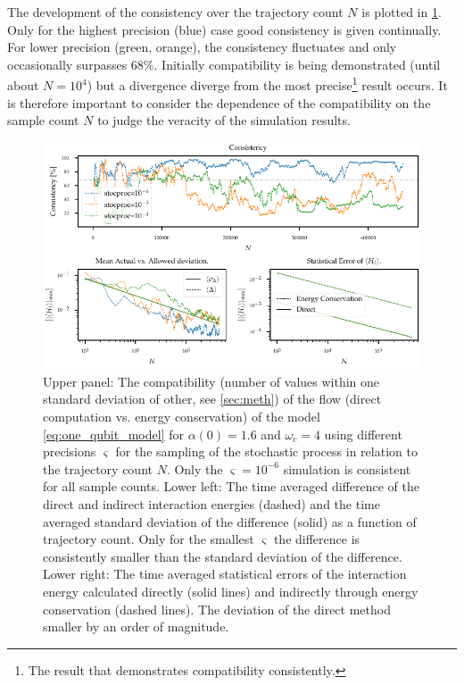 The development of the consistency over the trajectory count \(N\) is
plotted in \cref{fig:stocproc_consistency_dev}. Only for the highest
precision (blue) case good consistency is given continually. For lower
precision (green, orange), the consistency fluctuates and only
occasionally surpasses \(68\%\). Initially compatibility is being
demonstrated (until about \(N=10^4\)) but a divergence diverge from
the most precise\footnote{The result that demonstrates compatibility
  consistently.} result occurs. It is therefore important to consider
the dependence of the compatibility on the sample count \(N\) to judge
the veracity of the simulation results.
\begin{figure}[htp]
  \centering
  \includegraphics{figs/one_bath_syst/stocproc_systematics_consistency}
  \caption{\label{fig:stocproc_consistency_dev} Upper panel: The
    compatibility (number of values within one standard deviation of
    other, see \cref{sec:meth}) of the flow (direct computation
    vs. energy conservation) of the model \cref{eq:one_qubit_model}
    for \(α(0)=1.6\) and \(ω_c=4\) using different precisions
    \(\varsigma\) for the sampling of the stochastic process in
    relation to the trajectory count \(N\). Only the
    \(\varsigma=10^{-6}\) simulation is consistent for all sample
    counts. Lower left: The time averaged difference of the direct and
    indirect interaction energies (dashed) and the time averaged
    standard deviation of the difference (solid) as a function of
    trajectory count. Only for the smallest \(\varsigma\) the
    difference is consistently smaller than the standard deviation of
    the difference. Lower right: The time averaged statistical errors
    of the interaction energy calculated directly (solid lines) and
    indirectly through energy conservation (dashed lines). The
    deviation of the direct method smaller by an order of magnitude.}
\end{figure}

